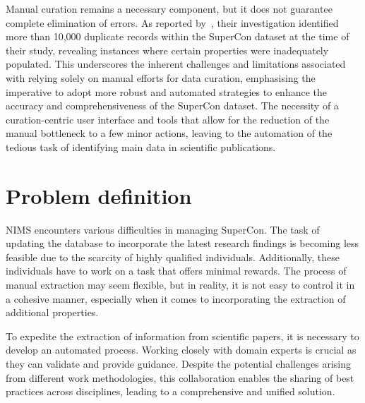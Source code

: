 Manual curation remains a necessary component, but it does not guarantee complete elimination of errors. As reported by~\cite{sommer20223dsc}, their investigation identified more than 10,000 duplicate records within the SuperCon dataset at the time of their study, revealing instances where certain properties were inadequately populated. 
This underscores the inherent challenges and limitations associated with relying solely on manual efforts for data curation, emphasising the imperative to adopt more robust and automated strategies to enhance the accuracy and comprehensiveness of the SuperCon dataset.
The necessity of a curation-centric user interface and tools that allow for the reduction of the manual bottleneck to a few minor actions, leaving to the automation of the tedious task of identifying main data in scientific publications.


\section{Problem definition}

NIMS encounters various difficulties in managing SuperCon. The task of updating the database to incorporate the latest research findings is becoming less feasible due to the scarcity of highly qualified individuals. Additionally, these individuals have to work on a task that offers minimal rewards.
The process of manual extraction may seem flexible, but in reality, it is not easy to control it in a cohesive manner, especially when it comes to incorporating the extraction of additional properties.

To expedite the extraction of information from scientific papers, it is necessary to develop an automated process. Working closely with domain experts is crucial as they can validate and provide guidance. Despite the potential challenges arising from different work methodologies, this collaboration enables the sharing of best practices across disciplines, leading to a comprehensive and unified solution.

